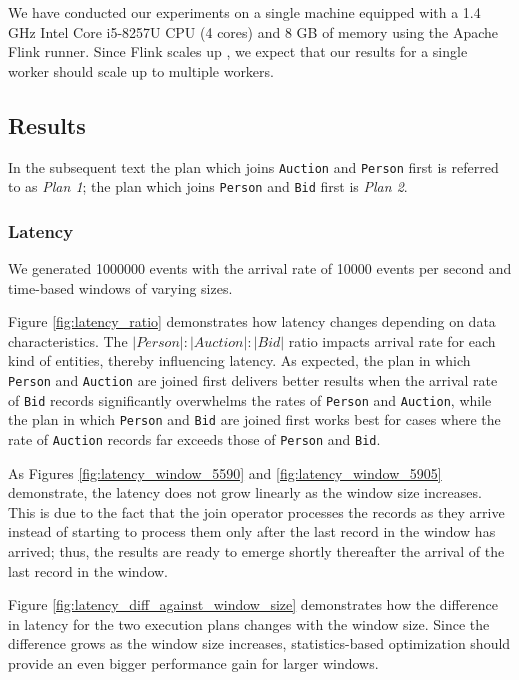 We have conducted our experiments on a single machine equipped with a 1.4 GHz Intel Core i5-8257U CPU (4 cores) and 8 GB of memory using the Apache Flink runner. Since Flink scales up \cite{karimov2018benchmarking}, we expect that our results for a single worker should scale up to multiple workers.

\subsection{Results}

In the subsequent text the plan which joins \texttt{Auction} and \texttt{Person} first is referred to as \textit{Plan 1}; the plan which joins \texttt{Person} and \texttt{Bid} first is \textit{Plan 2}.
\subsubsection{Latency}

We generated 1000000 events with the arrival rate of 10000 events per second and time-based windows of varying sizes.

Figure \ref{fig:latency_ratio} demonstrates how latency changes depending on data characteristics. The $|Person|:|Auction|:|Bid|$ ratio impacts arrival rate for each kind of entities, thereby influencing latency. As expected, the plan in which \texttt{Person} and \texttt{Auction} are joined first delivers better results when the arrival rate of \texttt{Bid} records significantly overwhelms the rates of \texttt{Person} and \texttt{Auction}, while the plan in which \texttt{Person} and \texttt{Bid} are joined first works best for cases where the rate of \texttt{Auction} records far exceeds those of \texttt{Person} and \texttt{Bid}. 

As Figures \ref{fig:latency_window_5590} and \ref{fig:latency_window_5905} demonstrate, the latency does not grow linearly as the window size increases. This is due to the fact that the join operator processes the records as they arrive instead of starting to process them only after the last record in the window has arrived; thus, the results are ready to emerge shortly thereafter the arrival of the last record in the window.

Figure \ref{fig:latency_diff_against_window_size} demonstrates how the difference in latency for the two execution plans changes with the window size. Since the difference grows as the window size increases, statistics-based optimization should provide an even bigger performance gain for larger windows.

